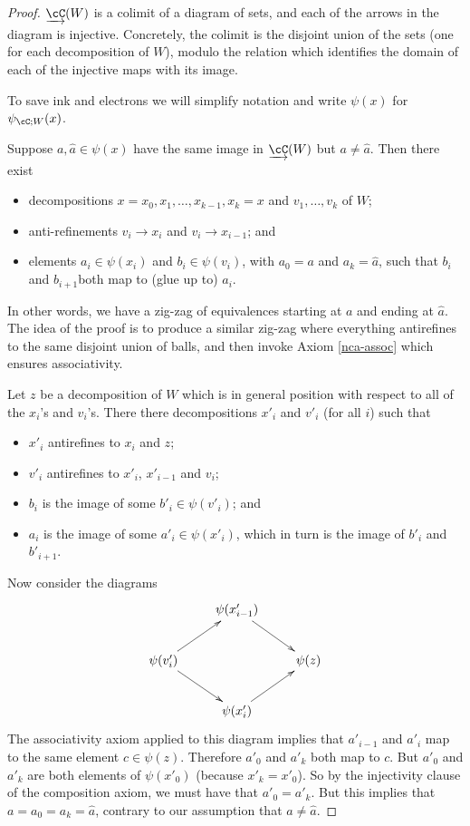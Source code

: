\begin{proof}
$\cl{\cC}(W)$ is a colimit of a diagram of sets, and each of the arrows in the diagram is
injective.
Concretely, the colimit is the disjoint union of the sets (one for each decomposition of $W$),
modulo the relation which identifies the domain of each of the injective maps
with its image.

To save ink and electrons we will simplify notation and write $\psi(x)$ for $\psi_{\cC;W}(x)$.

Suppose $a, \hat{a}\in \psi(x)$ have the same image in $\cl{\cC}(W)$ but $a\ne \hat{a}$.
Then there exist
\begin{itemize}
\item decompositions $x = x_0, x_1, \ldots , x_{k-1}, x_k = x$ and $v_1,\ldots, v_k$ of $W$;
\item anti-refinements $v_i\to x_i$ and $v_i\to x_{i-1}$; and
\item elements $a_i\in \psi(x_i)$ and $b_i\in \psi(v_i)$, with $a_0 = a$ and $a_k = \hat{a}$, 
such that $b_i$ and $b_{i+1}$both map to (glue up to) $a_i$.
\end{itemize}
In other words, we have a zig-zag of equivalences starting at $a$ and ending at $\hat{a}$.
The idea of the proof is to produce a similar zig-zag where everything antirefines to the same
disjoint union of balls, and then invoke Axiom \ref{nca-assoc} which ensures associativity.

Let $z$ be a decomposition of $W$ which is in general position with respect to all of the 
$x_i$'s and $v_i$'s.
There there decompositions $x'_i$ and $v'_i$ (for all $i$) such that
\begin{itemize}
\item $x'_i$ antirefines to $x_i$ and $z$;
\item $v'_i$ antirefines to $x'_i$, $x'_{i-1}$ and $v_i$;
\item $b_i$ is the image of some $b'_i\in \psi(v'_i)$; and
\item $a_i$ is the image of some $a'_i\in \psi(x'_i)$, which in turn is the image
of $b'_i$ and $b'_{i+1}$.
\end{itemize}
Now consider the diagrams
\[ \xymatrix{
	& \psi(x'_{i-1}) \ar[rd] & \\
	\psi(v'_i) \ar[ru] \ar[rd] & & \psi(z) \\
	& \psi(x'_i) \ar[ru] &
} \]
The associativity axiom applied to this diagram implies that $a'_{i-1}$ and $a'_i$
map to the same element $c\in \psi(z)$.
Therefore $a'_0$ and $a'_k$ both map to $c$.
But $a'_0$ and $a'_k$ are both elements of $\psi(x'_0)$ (because $x'_k = x'_0$).
So by the injectivity clause of the composition axiom, we must have that $a'_0 = a'_k$.
But this implies that $a = a_0 = a_k = \hat{a}$, contrary to our assumption that $a\ne \hat{a}$.
\end{proof}

